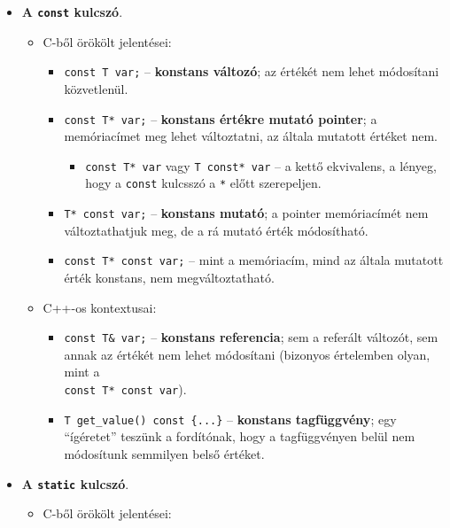 \documentclass[a4paper, 11pt, oneside]{book}
\begin{document}
\begin{itemize}
	\item \textbf{A \texttt{const} kulcszó}.
	
	\begin{itemize}
		\item C-ből örökölt jelentései:
		
		\begin{itemize}
			\item \verb|const T var;| -- \textbf{konstans változó}; az értékét nem lehet módosítani közvetlenül.
			\item \verb|const T* var;| -- \textbf{konstans értékre mutató pointer}; a memóriacímet meg lehet változtatni, az általa mutatott értéket nem.
			
			\begin{itemize}
				\item \verb|const T* var| vagy \verb|T const* var| -- a kettő ekvivalens, a lényeg, hogy a \verb|const| kulcsszó a \verb*|*| előtt szerepeljen.
			\end{itemize}
			
			\item \verb|T* const var;| -- \textbf{konstans mutató}; a pointer memóriacímét nem változtathatjuk meg, de a rá mutató érték módosítható.
			\item \verb|const T* const var;| -- mint a memóriacím, mind az általa mutatott érték konstans, nem megváltoztatható.
		\end{itemize}
		
		\item C++-os kontextusai:
		
		\begin{itemize}
			\item \verb|const T& var;| -- \textbf{konstans referencia}; sem a referált változót, sem annak az értékét nem lehet módosítani (bizonyos értelemben olyan, mint a \\ \verb|const T* const var|).
			\item \verb|T get_value() const {...}| -- \textbf{konstans tagfüggvény}; egy ``ígéretet'' teszünk a fordítónak, hogy a tagfüggvényen belül nem módosítunk semmilyen belső értéket.
		\end{itemize}
	\end{itemize}
	
	\item \textbf{A \texttt{static} kulcszó}.
	
	\begin{itemize}
		\item C-ből örökölt jelentései:
		

\end{itemize}
\end{itemize}
\end{document}
